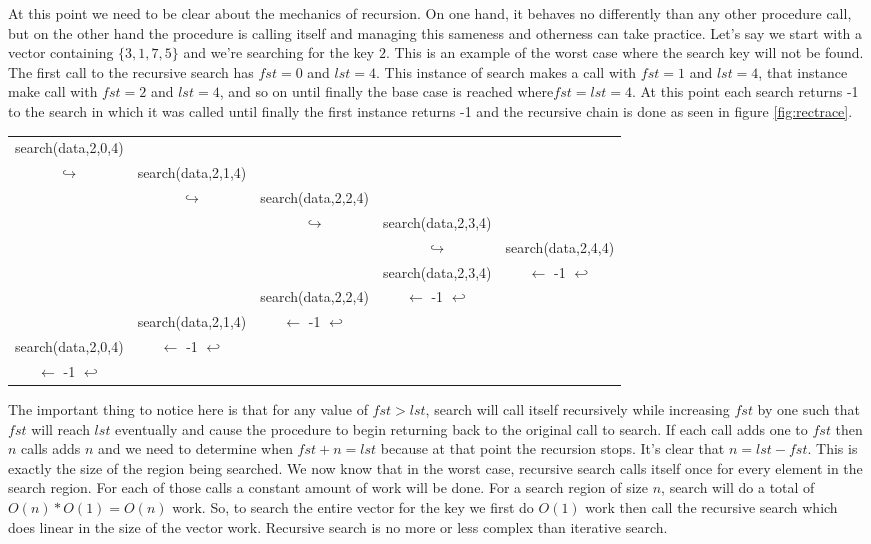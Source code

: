 \documentclass[]{tufte-handout}
\begin{document}
At this point we need to be clear about the mechanics of recursion. On one hand, it behaves no differently than any other procedure call, but on the other hand the procedure is calling itself and managing this sameness and otherness can take practice.  Let's say we start with a vector containing $\{3,1,7,5\}$ and we're searching for the key $2$. This is an example of the worst case where the search key will not be found. The first call to the recursive search has $fst=0$ and $lst=4$. This instance of search makes a call with $fst=1$ and $lst=4$, that instance make call with $fst=2$ and $lst=4$, and so on until finally the base case is reached where$fst=lst=4$. At this point each search returns -1 to the search in which it was called until finally the first instance returns -1 and the recursive chain is done as seen in figure \ref{fig:rectrace}.

\begin{figure*}[!htbp]
\begin{tabular}{ccccc}
search(data,2,0,4) & & & &  \\
$\hookrightarrow$ & search(data,2,1,4) & & & \\
& $\hookrightarrow$ & search(data,2,2,4) & & \\
&  &  $\hookrightarrow$ & search(data,2,3,4) & \\
& &  &  $\hookrightarrow$ & search(data,2,4,4) \\
& &  & search(data,2,3,4) & $\leftarrow$ -1  $\hookleftarrow$ \\
&  & search(data,2,2,4) & $\leftarrow$ -1  $\hookleftarrow$ & \\
& search(data,2,1,4) & $\leftarrow$ -1  $\hookleftarrow$ & & \\
search(data,2,0,4) &$\leftarrow$ -1  $\hookleftarrow$ & & & \\
$\leftarrow$ -1 $\hookleftarrow$ & & & & 
\end{tabular}
\caption{An example sequence of recursive search calls for $data=\{3,1,7,5\}$ }
\label{fig:rectrace}
\end{figure*}

The important thing to notice here is that for any value of $fst > lst$, search will call itself recursively while increasing $fst$ by one such that $fst$ will reach $lst$ eventually and cause the procedure to begin returning back to the original call to search. If each call adds one to $fst$ then $n$ calls adds $n$ and we need to determine when $fst+n=lst$ because at that point the recursion stops. It's clear that $n=lst-fst$. This is exactly the size of the region being searched. We now know that in the worst case, recursive search calls itself once for every element in the search region. For each of those calls a constant amount of work will be done. For a search region of size $n$, search will do a total of $O(n)*O(1)=O(n)$ work. So, to search the entire vector for the key we first do $O(1)$ work then call the recursive search which does linear in the size of the vector work. Recursive search is no more or less complex than iterative search. 
\end{document}
